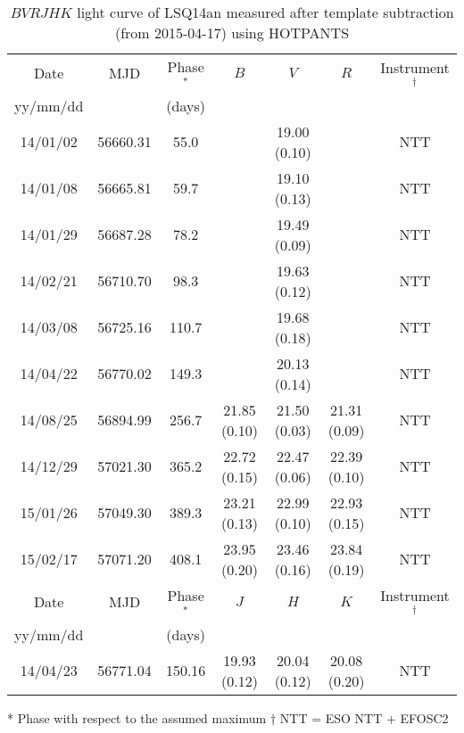 \documentclass[useAMS,usenatbib]{mn2e}
\begin{document}
\begin{table*}
\caption{$BVRJHK$ light curve of LSQ14an measured after template subtraction (from 2015-04-17) using HOTPANTS}
\begin{center}
\begin{tabular}{ccccccc}
\hline
Date & MJD & Phase$^*$ & $B$& $V$ & $R$ & Instrument$^{\dagger}$\\
yy/mm/dd &  & (days)  &   & & &\\
\hline
14/01/02 &  56660.31 & 55.0 &&   19.00 (0.10) &  &     NTT\\
14/01/08 & 56665.81 &  59.7  &&  19.10 (0.13) &  &     NTT\\
14/01/29 & 56687.28 &  78.2  &&  19.49 (0.09) &  &    NTT\\
14/02/21 & 56710.70 &  98.3  &&  19.63 (0.12) &  &     NTT\\
14/03/08 & 56725.16 &  110.7&  &  19.68 (0.18) &  &     NTT\\
14/04/22 & 56770.02 &  149.3 & &  20.13 (0.14) &  &     NTT\\
14/08/25	&	56894.99	&	256.7	&	21.85 (0.10)	&	21.50 (0.03)	&	21.31 (0.09)		&	NTT \\
14/12/29	&	57021.30	&	365.2	&	22.72 (0.15)	&	22.47 (0.06)	&	22.39 (0.10)		&	NTT \\
15/01/26	&	57049.30	&	389.3	&	23.21 (0.13)	&	22.99 (0.10)	&	22.93 (0.15)		&	NTT \\
15/02/17	&	57071.20	&	408.1	&	23.95 (0.20)	&	23.46 (0.16)	&	23.84 (0.19)		&	NTT \\
\hline
Date & MJD & Phase$^*$ & $J$ & $H$ & $K$ & Instrument$^{\dagger}$\\
yy/mm/dd &  & (days)  &   & & &\\
\hline
14/04/23 &  56771.04 & 150.16 &    19.93  (0.12) &    20.04 (0.12)  &   20.08  (0.20) &  NTT\\
\hline
\end{tabular}
\end{center}
* Phase with respect to the assumed maximum
$\dagger$  NTT = ESO NTT + EFOSC2
\label{table:snmv}
\end{table*}%
\end{document}
